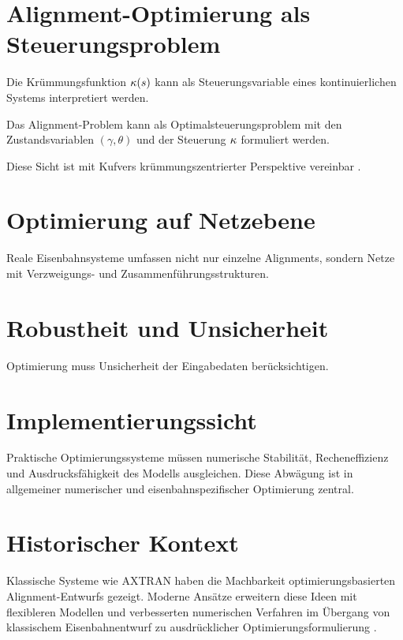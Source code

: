 \section{Alignment-Optimierung als Steuerungsproblem}
Die Krümmungsfunktion \(\kappa(s)\) kann als Steuerungsvariable eines
kontinuierlichen Systems interpretiert werden.
\begin{definition}[Steuerungsformulierung]
Das Alignment-Problem kann als Optimalsteuerungsproblem mit den
Zustandsvariablen \((\gamma,\theta)\) und der Steuerung \(\kappa\) formuliert
werden.
\end{definition}
Diese Sicht ist mit Kufvers krümmungszentrierter Perspektive vereinbar
\cite{Kufver1997MathematicalDescription,Kufver2000RailwayAlignment}.

\section{Optimierung auf Netzebene}
Reale Eisenbahnsysteme umfassen nicht nur einzelne Alignments, sondern Netze
mit Verzweigungs- und Zusammenführungsstrukturen.

\section{Robustheit und Unsicherheit}
Optimierung muss Unsicherheit der Eingabedaten berücksichtigen.

\section{Implementierungssicht}
Praktische Optimierungssysteme müssen numerische Stabilität, Recheneffizienz
und Ausdrucksfähigkeit des Modells ausgleichen. Diese Abwägung ist in
allgemeiner numerischer \cite{Nocedal2006NumericalOptimization} und
eisenbahnspezifischer Optimierung \cite{Kufver2000RailwayAlignment} zentral.

\section{Historischer Kontext}
Klassische Systeme wie AXTRAN haben die Machbarkeit optimierungsbasierten
Alignment-Entwurfs gezeigt. Moderne Ansätze erweitern diese Ideen mit
flexibleren Modellen und verbesserten numerischen Verfahren im Übergang von
klassischem Eisenbahnentwurf zu ausdrücklicher Optimierungsformulierung
\cite{Kufver2000RailwayAlignment}.
